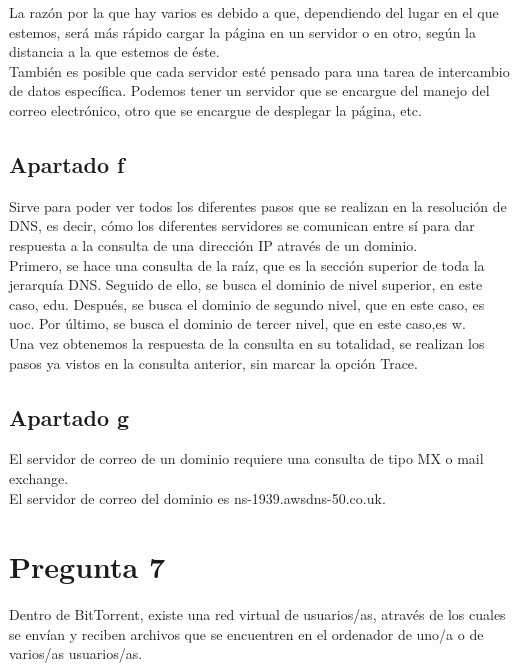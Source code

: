 \documentclass[spanish]{article}
\begin{document}
La razón por la que hay varios es debido a que, dependiendo
del lugar en el que estemos, será más rápido cargar la
página en un servidor o en otro, según la distancia a la que
estemos de éste.\\

También es posible que cada servidor esté pensado para una
tarea de intercambio de datos específica. Podemos tener un
servidor que se encargue del manejo del correo electrónico,
otro que se encargue de desplegar la página, etc.

\subsection{Apartado f}

Sirve para poder ver todos los diferentes pasos que se
realizan en la resolución de DNS, es decir, cómo los
diferentes servidores se comunican entre sí para dar
respuesta a la consulta de una dirección IP através de un
dominio.\\

Primero, se hace una consulta de la raíz, que es la sección
superior de toda la jerarquía DNS. Seguido de ello, se busca
el dominio de nivel superior, en este caso, edu. Después, se
busca el dominio de segundo nivel, que en este caso, es uoc.
Por último, se busca el dominio de tercer nivel, que en este
caso,es w.\\

Una vez obtenemos la respuesta de la consulta en su
totalidad, se realizan los pasos ya vistos en la consulta
anterior, sin marcar la opción Trace.

\subsection{Apartado g}

El servidor de correo de un dominio requiere una consulta de
tipo MX o mail exchange.\\

El servidor de correo del dominio es
ns-1939.awsdns-50.co.uk.

\section{Pregunta 7}

Dentro de BitTorrent, existe una red virtual de usuarios/as,
através de los cuales se envían y reciben archivos que se
encuentren en el ordenador de uno/a o de varios/as
usuarios/as.\\
\end{document}
